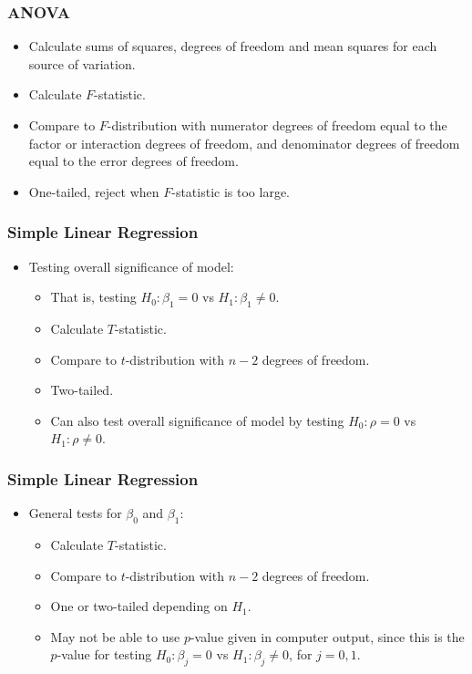 \documentclass[12pt]{beamer}
\begin{document}
\begin{frame}
	\frametitle{ANOVA}
	
	\begin{itemize}[label={\color{blue}$\blacktriangleright$}]
		\item Calculate sums of squares, degrees of freedom and mean squares for each source of variation.
		
		\item Calculate $F$-statistic.
		
		\item Compare to $F$-distribution with numerator degrees of freedom equal to the factor or interaction degrees of freedom, and denominator degrees of freedom equal to the error degrees of freedom.
		
		\item One-tailed, reject when $F$-statistic is too large.
	\end{itemize}
	
\end{frame}
\begin{frame}
	\frametitle{Simple Linear Regression}
	
	\begin{itemize}[label={\color{blue}$\blacktriangleright$}]
		\item Testing overall significance of model:
		\begin{itemize}[label={\color{blue}$\blacktriangleright$}]
			\item That is, testing $H_0 : \beta_1 = 0$ vs $H_1 : \beta_1 \neq 0$.
			\item Calculate $T$-statistic.
			\item Compare to $t$-distribution with $n-2$ degrees of freedom.
			\item Two-tailed.
			\item Can also test overall significance of model by testing $H_0 : \rho = 0$ vs $H_1 : \rho \neq 0$.
		\end{itemize}
	\end{itemize}
	
\end{frame}
\begin{frame}
	\frametitle{Simple Linear Regression}
	
	\begin{itemize}[label={\color{blue}$\blacktriangleright$}]
		\item General tests for $\beta_0$ and $\beta_1$:
		\begin{itemize}[label={\color{blue}$\blacktriangleright$}]
			\item Calculate $T$-statistic.
			\item Compare to $t$-distribution with $n-2$ degrees of freedom.
			\item One or two-tailed depending on $H_1$.
			\item May not be able to use $p$-value given in computer output, since this is the $p$-value for testing $H_0 : \beta_j = 0$ vs $H_1 : \beta_j \neq 0$, for $j = 0,1$.
		\end{itemize}
	\end{itemize}
	
\end{frame}
\end{document}
